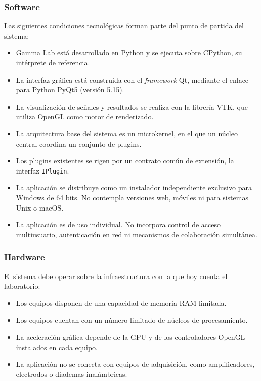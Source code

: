 \documentclass[11pt,a4paper]{article}
\DeclareRobustCommand{\_}{\textunderscore\allowbreak}
\begin{document}
\subsubsection{Software}
Las siguientes condiciones tecnológicas forman parte del punto de partida del sistema:
\begin{itemize}[nosep]
    \item Gamma Lab está desarrollado en Python y se ejecuta sobre CPython, su intérprete de referencia.
    \item La interfaz gráfica está construida con el \textit{framework} Qt, mediante el enlace para Python PyQt5 (versión 5.15).
    \item La visualización de señales y resultados se realiza con la librería VTK, que utiliza OpenGL como motor de renderizado.
    \item La arquitectura base del sistema es un microkernel, en el que un núcleo central coordina un conjunto de plugins.
    \item Los plugins existentes se rigen por un contrato común de extensión, la interfaz \texttt{IPlugin}.
    \item La aplicación se distribuye como un instalador independiente exclusivo para Windows de 64 bits. No contempla versiones web, móviles ni para sistemas Unix o macOS.
    \item La aplicación es de uso individual. No incorpora control de acceso multiusuario, autenticación en red ni mecanismos de colaboración simultánea.
\end{itemize}

\subsubsection{Hardware}
El sistema debe operar sobre la infraestructura con la que hoy cuenta el laboratorio:
\begin{itemize}[nosep]
    \item Los equipos disponen de una capacidad de memoria RAM limitada.
    \item Los equipos cuentan con un número limitado de núcleos de procesamiento.
    \item La aceleración gráfica depende de la GPU y de los controladores OpenGL instalados en cada equipo.
    \item La aplicación no se conecta con equipos de adquisición, como amplificadores, electrodos o diademas inalámbricas.
\end{itemize}
\end{document}
